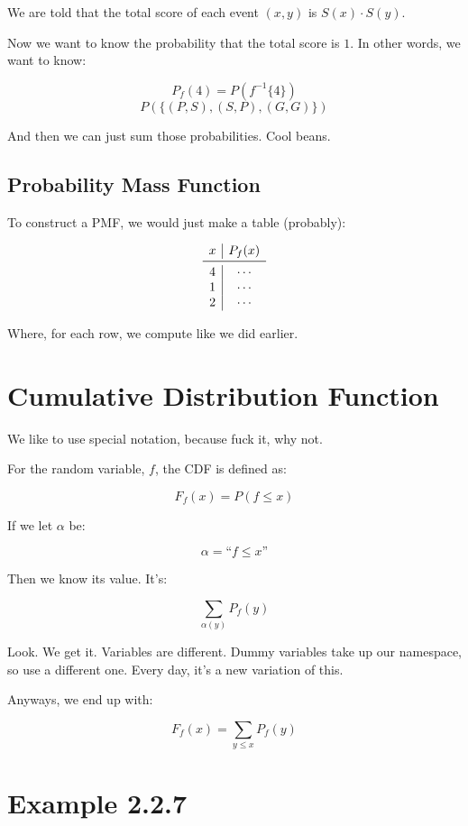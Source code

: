 \documentclass{article}
\newcommand{\inv}[1]{#1^{-1}}
\begin{document}
We are told that the total score of each event $(x,y)$ is
$S(x)\cdot{}S(y)$.

Now we want to know the probability that the total score is $1$. In
other words, we want to know:

\[
P_f(4) = P(\inv{f}\{4\})
\] \[
P(\{(P,S),(S,P),(G,G)\})
\]

And then we can just sum those probabilities. Cool beans.

\subsection*{Probability Mass Function}

To construct a PMF, we would just make a table (probably):

\[
\begin{array}{c|c}
x & P_f(x) \\
\midrule
4 & \cdots \\
1 & \cdots \\
2 & \cdots \\
\end{array}
\]

Where, for each row, we compute like we did earlier.

\section*{Cumulative Distribution Function}

We like to use special notation, because fuck it, why not.

For the random variable, $f$, the CDF is defined as:

\[
F_f(x)=P(f\le x)
\]

If we let $\alpha$ be:

\[
\alpha=\text{``$f\le x$''}
\]

Then we know its value. It's:

\[
\sum\limits_{\alpha(y)}P_f(y)
\]

Look. We get it. Variables are different. Dummy variables take up our
namespace, so use a different one. Every day, it's a new variation of
this.

Anyways, we end up with:

\[
F_f(x) = \sum\limits_{y\le x}P_f(y)
\]

\section*{Example 2.2.7}
\end{document}
